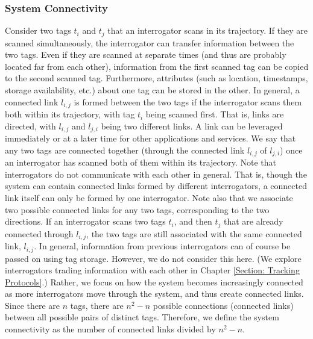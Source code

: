 \subsubsection{\textbf{System Connectivity}}
Consider two tags $t_i$ and $t_j$ that an interrogator scans in its trajectory. If they are scanned simultaneously, the interrogator can transfer information between the two tags. Even if they are scanned at separate times (and thus are probably located far from each other), information from the first scanned tag can be copied to the second scanned tag. Furthermore, attributes (such as location, timestamps, storage availability, etc.) about one tag can be stored in the other. In general, a connected link $l_{i,j}$ is formed between the two tags if the interrogator scans them both within its trajectory, with tag $t_i$ being scanned first. That is, links are directed, with $l_{i,j}$ and $l_{j,i}$ being two different links. A link can be leveraged immediately or at a later time for other applications and services. We say that any two tags are connected together (through the connected link $l_{i,j}$ of $l_{j,i}$) once an interrogator has scanned both of them within its trajectory. Note that interrogators do not communicate with each other in general. That is, though the system can contain connected links formed by different interrogators, a connected link itself can only be formed by one interrogator. Note also that we associate two possible connected links for any two tags, corresponding to the two directions. If an interrogator scans two tags $t_i$, and then $t_j$ that are already connected through $l_{i,j}$, the two tags are still associated with the same connected link, $l_{i,j}$. In general, information from previous interrogators can of course be passed on using tag storage. However, we do not consider this here. (We explore interrogators trading information with each other in Chapter \ref{Section: Tracking Protocols}.) Rather, we focus on how the system becomes increasingly connected as more interrogators move through the system, and thus create connected links. Since there are $n$ tags, there are $n^2 - n$ possible connections (connected links) between all possible pairs of distinct tags. Therefore, we define the system connectivity as the number of connected links divided by $n^2 - n$. 

